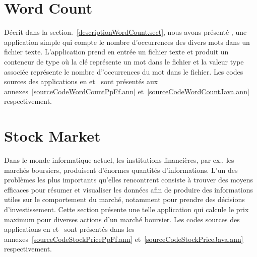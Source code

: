 \section{Word Count}
\label{wordcount.sect}

D\'ecrit dans la section.~\ref{descriptionWordCount.sect}, nous avons pr\'esent\'e , une application simple qui compte le nombre d'occurrences des divers mots dans un fichier texte. L'application prend en entr\'ee un fichier texte et produit un conteneur de type  où la cl\'e repr\'esente un mot dans le fichier et la valeur  type   associ\'ee repr\'esente le nombre d''occurrences du mot dans le fichier. Les codes sources des applications  en  et~ sont pr\'esent\'es aux annexes~\ref{sourceCodeWordCountPpFf.ann} et~\ref{sourceCodeWordCountJava.ann} respectivement.






\section{Stock Market}
\label{stockprice.sect}


Dans le monde informatique actuel, les institutions financi\`eres, par ex., les march\'es boursiers, produisent d'\'enormes quantit\'es d'informations. L'un des probl\`emes les plus importants qu'elles rencontrent consiste \`a trouver des moyens efficaces pour r\'esumer et visualiser les donn\'ees afin de produire des informations utiles sur le comportement du march\'e, notamment pour prendre des d\'ecisions d'investissement. Cette section pr\'esente une telle application qui calcule le prix maximum pour diverses actions d'un marché boursier. Les codes sources des applications  en  et~ sont pr\'esent\'es dans les annexes~\ref{sourceCodeStockPricePpFf.ann} et~\ref{sourceCodeStockPriceJava.ann} respectivement. 

